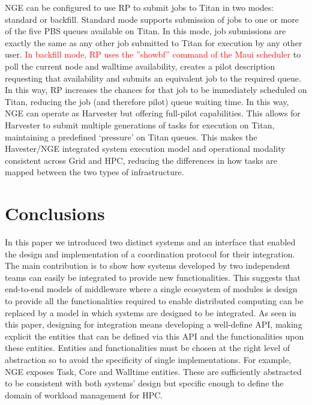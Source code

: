 \documentclass{webofc}
\begin{document}
NGE can be configured to use RP to submit jobs to Titan in two modes:
standard or backfill. Standard mode supports submission of jobs to one or
more of the five PBS queues available on Titan. In this mode, job submissions
are exactly the same as any other job submitted to Titan for execution by any
other user. \textcolor{red}{In backfill mode, RP uses the ''showbf'' command of the Maui scheduler} to
poll the current node and walltime availability, creates a pilot description
requesting that availability and submits an equivalent job to the required
queue. In this way, RP increases the chances for that job to be immediately
scheduled on Titan, reducing the job (and therefore pilot) queue waiting
time. In this way, NGE can operate as Harvester but offering full-pilot
capabilities. This allows for Harvester to submit multiple generations of
tasks for execution on Titan, maintaining a predefined ‘pressure’ on Titan
queues. This makes the Havester/NGE integrated system execution model and
operational modality consistent across Grid and HPC, reducing the differences
in how tasks are mapped between the two types of infrastructure.


\section{Conclusions}

In this paper we introduced two distinct systems and an interface that
enabled the design and implementation of a coordination protocol for their
integration. The main contribution is to show how systems developed by two
independent teams can easily be integrated to provide new functionalities.
This suggests that end-to-end models of middleware where a single ecosystem
of modules is design to provide all the functionalities required to enable
distributed computing can be replaced by a model in which systems are
designed to be integrated. As seen in this paper, designing for integration
means developing a well-define API, making explicit the entities that can be
defined via this API and the functionalities upon these entities. Entities
and functionalities must be chosen at the right level of abstraction so to
avoid the specificity of single implementations. For example, NGE exposes
Task, Core and Walltime entities. These are sufficiently abstracted to be
consistent with both systems’ design but specific enough to define the domain
of workload management for HPC.
\end{document}
